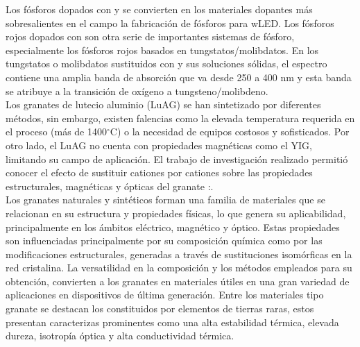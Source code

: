 Los fósforos dopados con  y  se convierten en los
materiales dopantes más sobresalientes en el campo la fabricación de fósforos
para wLED. Los fósforos rojos dopados con  son otra serie de
importantes sistemas de fósforo, especialmente los fósforos rojos
basados en tungstatos/molibdatos. En los tungstatos o molibdatos sustituidos
con  y sus soluciones sólidas, el espectro contiene una amplia
banda de absorción que va desde 250 a 400 nm y esta banda se atribuye a la
transición de oxígeno a tungsteno/molibdeno\cite{Kasturi2016,Wu2018}.\\

Los granates de lutecio aluminio (LuAG) se han sintetizado por
diferentes métodos, sin embargo, existen falencias como la elevada temperatura
requerida en el proceso (más de 1400$^{\circ}$C) o la necesidad de equipos costosos y
sofisticados. Por otro lado, el LuAG no cuenta con propiedades magnéticas como
el YIG, limitando su campo de aplicación. El trabajo de investigación realizado
permitió conocer el efecto de sustituir cationes  por cationes  sobre
las propiedades estructurales, magnéticas y ópticas del granate
:.\\

Los granates naturales y sintéticos forman una familia de materiales que
se relacionan en su estructura y propiedades físicas, lo que genera su
aplicabilidad, principalmente en los ámbitos eléctrico, magnético y óptico.
Estas propiedades son influenciadas principalmente por su composición química
como por las modificaciones estructurales, generadas a través de sustituciones
isomórficas en la red cristalina\cite{Chenais2003}. La versatilidad en la
composición y los métodos empleados para su obtención, convierten a los
granates en materiales útiles en una gran variedad de aplicaciones en
dispositivos de última generación. Entre los materiales tipo granate se
destacan los constituidos por elementos de tierras raras, estos presentan
caracterizas prominentes como una alta estabilidad térmica, elevada dureza,
isotropía óptica y alta conductividad térmica\cite{MartinPereda1976,Mari2001,Liu2014,Birkel2012,Heer2002,Malinowski1999}.\\


